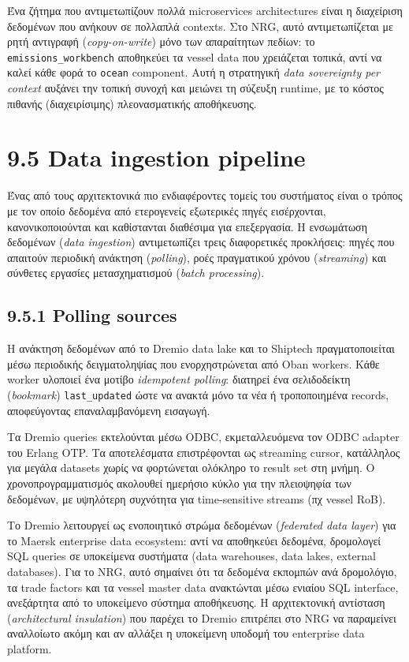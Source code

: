 Ένα ζήτημα που αντιμετωπίζουν πολλά microservices architectures είναι η
διαχείριση δεδομένων που ανήκουν σε πολλαπλά contexts. Στο NRG, αυτό
αντιμετωπίζεται με ρητή αντιγραφή (\emph{copy-on-write}) μόνο των
απαραίτητων πεδίων: το \texttt{emissions\_workbench} αποθηκεύει τα
vessel data που χρειάζεται τοπικά, αντί να καλεί κάθε φορά το
\texttt{ocean} component. Αυτή η στρατηγική \emph{data sovereignty per
context} αυξάνει την τοπική συνοχή και μειώνει τη σύζευξη runtime, με το
κόστος πιθανής (διαχειρίσιμης) πλεονασματικής αποθήκευσης.

\section{9.5 Data ingestion pipeline}\label{data-ingestion-pipeline}

Ένας από τους αρχιτεκτονικά πιο ενδιαφέροντες τομείς του συστήματος
είναι ο τρόπος με τον οποίο δεδομένα από ετερογενείς εξωτερικές πηγές
εισέρχονται, κανονικοποιούνται και καθίστανται διαθέσιμα για
επεξεργασία. Η ενσωμάτωση δεδομένων (\emph{data ingestion})
αντιμετωπίζει τρεις διαφορετικές προκλήσεις: πηγές που απαιτούν
περιοδική ανάκτηση (\emph{polling}), ροές πραγματικού χρόνου
(\emph{streaming}) και σύνθετες εργασίες μετασχηματισμού (\emph{batch
processing}).

\subsection{9.5.1 Polling sources}\label{polling-sources}

Η ανάκτηση δεδομένων από το Dremio data lake και το Shiptech
πραγματοποιείται μέσω περιοδικής δειγματοληψίας που ενορχηστρώνεται από
Oban workers. Κάθε worker υλοποιεί ένα μοτίβο \emph{idempotent polling}:
διατηρεί ένα σελιδοδείκτη (\emph{bookmark}) \texttt{last\_updated} ώστε
να ανακτά μόνο τα νέα ή τροποποιημένα records, αποφεύγοντας
επαναλαμβανόμενη εισαγωγή.

Τα Dremio queries εκτελούνται μέσω ODBC, εκμεταλλευόμενα τον ODBC
adapter του Erlang OTP. Τα αποτελέσματα επιστρέφονται ως streaming
cursor, κατάλληλος για μεγάλα datasets χωρίς να φορτώνεται ολόκληρο το
result set στη μνήμη. Ο χρονοπρογραμματισμός ακολουθεί ημερήσιο κύκλο
για την πλειοψηφία των δεδομένων, με υψηλότερη συχνότητα για
time-sensitive streams (πχ vessel RoB).

Το Dremio λειτουργεί ως ενοποιητικό στρώμα δεδομένων (\emph{federated
data layer}) για το Maersk enterprise data ecosystem: αντί να αποθηκεύει
δεδομένα, δρομολογεί SQL queries σε υποκείμενα συστήματα (data
warehouses, data lakes, external databases). Για το NRG, αυτό σημαίνει
ότι τα δεδομένα εκπομπών ανά δρομολόγιο, τα trade factors και τα vessel
master data ανακτώνται μέσω ενιαίου SQL interface, ανεξάρτητα από το
υποκείμενο σύστημα αποθήκευσης. Η αρχιτεκτονική αντίσταση
(\emph{architectural insulation}) που παρέχει το Dremio επιτρέπει στο
NRG να παραμείνει αναλλοίωτο ακόμη και αν αλλάξει η υποκείμενη υποδομή
του enterprise data platform.

